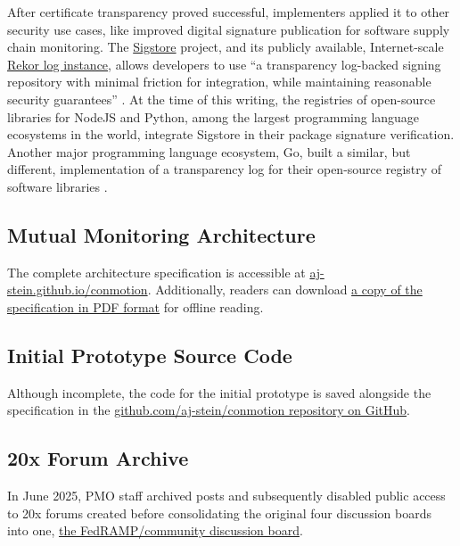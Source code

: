 \documentclass{jdf}
\begin{document}
After certificate transparency proved successful, implementers applied it to other security use cases, like improved digital signature publication for software supply chain monitoring. The \href{https://sigstore.dev}{Sigstore} project, and its publicly available, Internet-scale \href{https://rekor.sigstore.dev/}{Rekor log instance}, allows developers to use ``a transparency log-backed signing repository with minimal friction for integration, while maintaining reasonable security guarantees'' \cite[p.~2365]{newman22}. At the time of this writing, the registries of open-source libraries for NodeJS and Python, among the largest programming language ecosystems in the world, integrate Sigstore in their package signature verification. Another major programming language ecosystem, Go, built a similar, but different, implementation of a transparency log for their open-source registry of software libraries \cite{hockman19}.

\subsection{Mutual Monitoring Architecture} \label{architecture}

The complete architecture specification is accessible at \href{https://aj-stein.github.io/conmotion/architecture.html}{aj-stein.github.io/conmotion}. Additionally, readers can download \href{https://aj-stein.github.io/conmotion/architecture.pdf}{a copy of the specification in PDF format} for offline reading.

\subsection{Initial Prototype Source Code} \label{prototype}

Although incomplete, the code for the initial prototype is saved alongside the specification in the \href{https://github.com/aj-stein/conmotion/tree/main/conmotion}{github.com/aj-stein/conmotion repository on GitHub}.

\subsection{20x Forum Archive} \label{20x_archive}

In June 2025, PMO staff archived posts and subsequently disabled public access to 20x forums created before consolidating the original four discussion boards into one, \href{https://github.com/FedRAMP/community/discussions}{the FedRAMP/community discussion board}.
\end{document}
